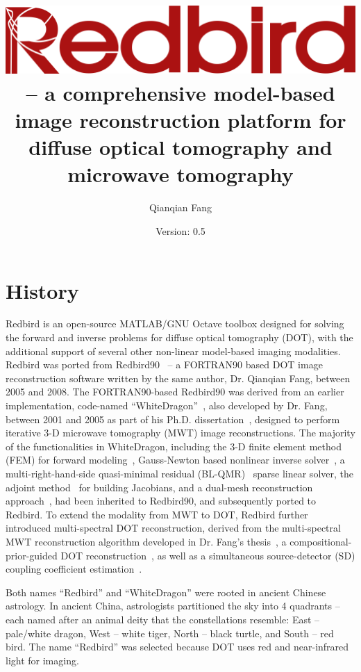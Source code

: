 \documentclass[12pt]{book}               %
\title{\includegraphics[width=\textwidth]{images/redbird_banner.png}
-- a comprehensive model-based image reconstruction platform for diffuse optical tomography and microwave tomography}
\author{Qianqian Fang}
\date{Version: 0.5}
\begin{document}
\maketitle              %

\tableofcontents

\chapter{History}

Redbird is an open-source MATLAB/GNU Octave toolbox designed for solving the forward and inverse
problems for diffuse optical tomography (DOT), with the additional support of 
several other non-linear model-based imaging modalities. Redbird was ported from 
Redbird90~\cite{Fang2008} -- a FORTRAN90 based DOT image reconstruction software written by the same author, Dr. Qianqian Fang, between 2005 and 2008. The FORTRAN90-based Redbird90 was derived from an earlier implementation, code-named ``WhiteDragon''~\cite{Fang2004, Fang2010c}, also developed by Dr. Fang, between 2001 and 2005 as part of his Ph.D. dissertation~\cite{FangThesis}, designed to perform iterative 3-D microwave tomography (MWT) image reconstructions. The majority of the functionalities in WhiteDragon, including the 3-D finite element method (FEM) for forward modeling~\cite{Fang2004}, Gauss-Newton based nonlinear inverse solver~\cite{Fang2009IEEE}, a multi-right-hand-side quasi-minimal residual (BL-QMR)~\cite{Boyse1996} sparse linear solver, the adjoint method~\cite{Fang2004} for building Jacobians, and a dual-mesh reconstruction approach~\cite{Paulsen1995}, had been inherited to Redbird90, and subsequently ported to Redbird. To extend the modality from MWT to DOT, Redbird further introduced multi-spectral DOT reconstruction, derived from the multi-spectral MWT reconstruction algorithm developed in Dr. Fang's thesis~\cite{FangThesis}, a compositional-prior-guided DOT reconstruction~\cite{Fang2010,Deng2015a}, as well as a simultaneous source-detector (SD) coupling coefficient estimation~\cite{Boas2001,Schweiger2007}. 

Both names ``Redbird'' and ``WhiteDragon'' were rooted in ancient Chinese astrology. In ancient China, astrologists partitioned the sky into 4 quadrants -- each named after an animal deity that the constellations resemble: East -- pale/white dragon, West -- white tiger, North -- black turtle, and South -- red bird. The name ``Redbird'' was selected because DOT uses red and near-infrared light for imaging.
\end{document}
